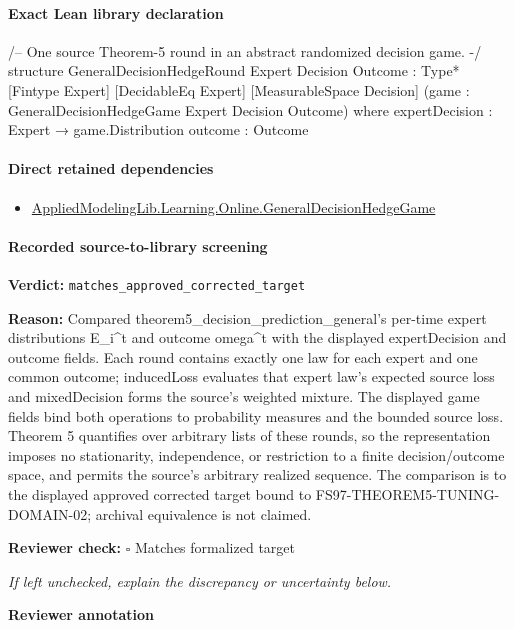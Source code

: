 \documentclass[10pt]{article}
\newcommand{\reviewerbox}{%
  \par\noindent\fbox{\parbox{0.96\linewidth}{\rule{0pt}{0.38in}}}\par
}
\newcommand{\reviewmatch}[1]{%
  \par\noindent\textbf{Reviewer check:} $\square$\; #1\par
  \noindent\emph{If left unchecked, explain the discrepancy or uncertainty below.}\par
}
\begin{document}
\paragraph{Exact Lean library declaration}
\begin{ReviewVerbatim}
/-- One source Theorem-5 round in an abstract randomized decision game. -/
structure GeneralDecisionHedgeRound
    {Expert Decision Outcome : Type*} [Fintype Expert] [DecidableEq Expert]
    [MeasurableSpace Decision]
    (game : GeneralDecisionHedgeGame Expert Decision Outcome) where
  expertDecision : Expert → game.Distribution
  outcome : Outcome
\end{ReviewVerbatim}

\paragraph{Direct retained dependencies}
\begin{itemize}\raggedright
\item \hyperlink{library-prerequisite-34621c1fa332891f}{Applied\allowbreak{}Modeling\allowbreak{}Lib.\allowbreak{}Learning.\allowbreak{}Online.\allowbreak{}General\allowbreak{}Decision\allowbreak{}Hedge\allowbreak{}Game}
\end{itemize}
\paragraph{Recorded source-to-library screening}
\textbf{Verdict:} \texttt{matches\_approved\_corrected\_target}
\\
{\raggedright
\textbf{Reason:} Compared theorem5\_\allowbreak{}decision\_\allowbreak{}prediction\_\allowbreak{}general's per-\allowbreak{}time expert distributions E\_\allowbreak{}i\textasciicircum{}t and outcome omega\textasciicircum{}t with the displayed expertDecision and outcome fields.\allowbreak{} Each round contains exactly one law for each expert and one common outcome;\allowbreak{} inducedLoss evaluates that expert law's expected source loss and mixedDecision forms the source's weighted mixture.\allowbreak{} The displayed game fields bind both operations to probability measures and the bounded source loss.\allowbreak{} Theorem 5 quantifies over arbitrary lists of these rounds, so the representation imposes no stationarity, independence, or restriction to a finite decision/\allowbreak{}outcome space, and permits the source's arbitrary realized sequence.\allowbreak{} The comparison is to the displayed approved corrected target bound to FS97-\allowbreak{}THEOREM5-\allowbreak{}TUNING-\allowbreak{}DOMAIN-\allowbreak{}02;\allowbreak{} archival equivalence is not claimed.\allowbreak{}
\par}
\reviewmatch{Matches formalized target}
\noindent\textbf{Reviewer annotation}\par
\reviewerbox
\clearpage
\hypertarget{library-prerequisite-12ac34c217dfdfb1}{}
\end{document}
